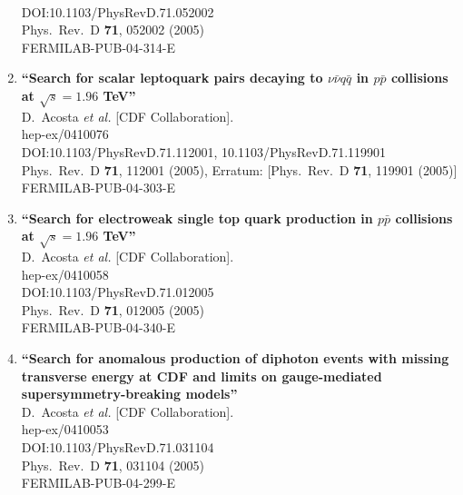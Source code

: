 \documentclass{article}
\begin{document}
\begin{enumerate}
  \\{}DOI:10.1103/PhysRevD.71.052002
  \\{}Phys.\ Rev.\ D {\bf 71}, 052002 (2005)
  \\{}FERMILAB-PUB-04-314-E
\item%
{\bf ``Search for scalar leptoquark pairs decaying to $\nu \bar{\nu} q \bar{q}$ in $p\bar{p}$ collisions at $\sqrt{s} = 1.96$ TeV''}
  \\{}D.~Acosta {\it et al.} [CDF Collaboration].
  \\{}hep-ex/0410076
  \\{}DOI:10.1103/PhysRevD.71.112001, 10.1103/PhysRevD.71.119901
  \\{}Phys.\ Rev.\ D {\bf 71}, 112001 (2005), Erratum: [Phys.\ Rev.\ D {\bf 71}, 119901 (2005)]
  \\{}FERMILAB-PUB-04-303-E
\item%
{\bf ``Search for electroweak single top quark production in $p\bar{p}$ collisions at $\sqrt{s} = 1.96$ TeV''}
  \\{}D.~Acosta {\it et al.} [CDF Collaboration].
  \\{}hep-ex/0410058
  \\{}DOI:10.1103/PhysRevD.71.012005
  \\{}Phys.\ Rev.\ D {\bf 71}, 012005 (2005)
  \\{}FERMILAB-PUB-04-340-E
\item%
{\bf ``Search for anomalous production of diphoton events with missing transverse energy at CDF and limits on gauge-mediated supersymmetry-breaking models''}
  \\{}D.~Acosta {\it et al.} [CDF Collaboration].
  \\{}hep-ex/0410053
  \\{}DOI:10.1103/PhysRevD.71.031104
  \\{}Phys.\ Rev.\ D {\bf 71}, 031104 (2005)
  \\{}FERMILAB-PUB-04-299-E

\end{enumerate}
\end{document}

